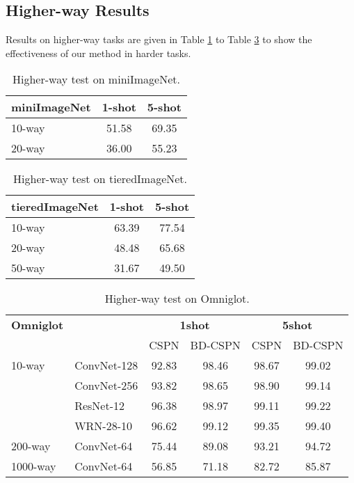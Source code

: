 \documentclass[runningheads]{llncs}
\begin{document}
\subsection{Higher-way Results}
Results on higher-way tasks are given in Table \ref{higher-mini} to Table \ref{higher-omni} to show the effectiveness of our method in harder tasks.

\vspace*{4\baselineskip} 


\begin{table}
\centering
\caption{Higher-way test on miniImageNet.}
\begin{tabular}{lcc}
\toprule
{\textbf{miniImageNet}} & {\textbf{1-shot}} & {\textbf{5-shot}} \\ \midrule
{10-way}                & {51.58}           & {69.35}           \\
{20-way}                & {36.00}           & {55.23}           \\ \midrule
\end{tabular}
\label{higher-mini}
\end{table}


\begin{table}
\centering
\caption{Higher-way test on tieredImageNet.}
\begin{tabular}{lcc}
\toprule
{\textbf{tieredImageNet}} & {\textbf{1-shot}} & {\textbf{5-shot}} \\ \midrule
{10-way}                  & {63.39}           & {77.54}           \\
{20-way}                  & {48.48}           & {65.68}           \\
{50-way}                  & {31.67}           & {49.50}          \\ \midrule
\end{tabular}
\label{higher-tiered}
\end{table}

\begin{table}
\centering
\caption{Higher-way test on Omniglot.}
\begin{tabular}{llcccc}
\toprule
{\textbf{Omniglot}}& & \multicolumn{2}{c}{{\textbf{1shot}}}& \multicolumn{2}{c}{{\textbf{5shot}}} \\ 
& & {CSPN}& {BD-CSPN} & {CSPN}  & {BD-CSPN} \\ \midrule
{10-way}& {ConvNet-128}& {92.83}& {98.46}  & {98.67} & {99.02}  \\
 &{ConvNet-256} & {93.82} & {98.65}  & {98.90} & {99.14}  \\
& {ResNet-12}& {96.38}& {98.97}  & {99.11} & {99.22}  \\
& {WRN-28-10}& {96.62}& {99.12}  & {99.35} & {99.40}  \\
{200-way}& {ConvNet-64}& {75.44}& {89.08}  & {93.21} & {94.72}  \\
{1000-way}& {ConvNet-64}& {56.85}& {71.18}  & {82.72} & {85.87}  \\ \midrule
\end{tabular}
\label{higher-omni}
\end{table}
\end{document}
